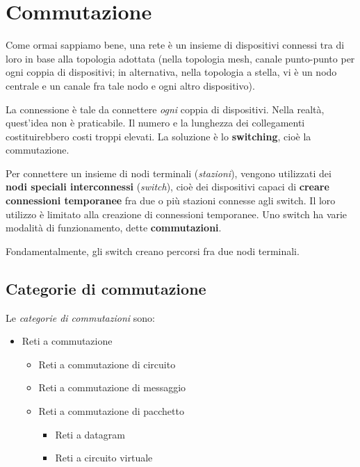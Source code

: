\section{Commutazione}
    Come ormai sappiamo bene, una rete è un insieme di dispositivi connessi tra di loro in base alla topologia adottata (nella topologia mesh, canale punto-punto per ogni coppia di dispositivi; in alternativa, nella topologia a stella, vi è un nodo centrale e un canale fra tale nodo e ogni altro dispositivo). 
    
    La connessione è tale da connettere \textit{ogni} coppia di dispositivi. Nella realtà, quest'idea non è praticabile. Il numero e la lunghezza dei collegamenti costituirebbero costi troppi elevati. La soluzione è lo \textbf{switching}, cioè la commutazione.
    
    \vspace{3mm}
    
    Per connettere un insieme di nodi terminali (\textit{stazioni}), vengono utilizzati dei \textbf{nodi speciali interconnessi} (\textit{switch}), cioè dei dispositivi capaci di \textbf{creare connessioni temporanee} fra due o più stazioni connesse agli switch. Il loro utilizzo è limitato alla creazione di connessioni temporanee. Uno switch ha varie modalità di funzionamento, dette \textbf{commutazioni}. 
    
    Fondamentalmente, gli switch creano percorsi fra due nodi terminali.
    
    \subsection{Categorie di commutazione}
    
        Le \textit{categorie di commutazioni} sono:
        
        \begin{itemize}
            \item 
                Reti a commutazione
            
            \begin{itemize}
                \item 
                    Reti a commutazione di circuito
                    
                \item 
                    Reti a commutazione di messaggio
    
                \item 
                    Reti a commutazione di pacchetto
                
                    \begin{itemize}
                        \item 
                            Reti a datagram
                            
                        \item 
                            Reti a circuito virtuale
                    \end{itemize}
            \end{itemize}
        \end{itemize}
    
